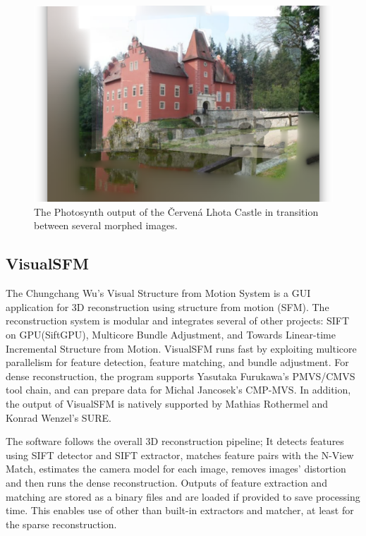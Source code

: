 \begin{figure}[ht]
	\begin{center}
		\includegraphics[keepaspectratio,width=\textwidth]{fig/Photosynth.png}
	\end{center}
	\caption{The Photosynth output of the Červená Lhota Castle in transition between several morphed images.}
	\label{fig:photosynth}
\end{figure}

\subsection*{VisualSFM}
The Chungchang Wu's Visual Structure from Motion System is a GUI application for 3D reconstruction using structure from motion (SFM). The reconstruction system is modular and integrates several of other projects: SIFT on GPU(SiftGPU), Multicore Bundle Adjustment, and Towards Linear-time Incremental Structure from Motion. VisualSFM runs fast by exploiting multicore parallelism for feature detection, feature matching, and bundle adjustment. For dense reconstruction, the program supports Yasutaka Furukawa's PMVS/CMVS tool chain, and can prepare data for Michal Jancosek's CMP-MVS. In addition, the output of VisualSFM is natively supported by Mathias Rothermel and Konrad Wenzel's SURE.

The software follows the overall 3D reconstruction pipeline; It detects features using SIFT detector and SIFT extractor, matches feature pairs with the N-View Match, estimates the camera model for each image, removes images' distortion and then runs the dense reconstruction. Outputs of feature extraction and matching are stored as a binary files and are loaded if provided to save processing time. This enables use of other than built-in extractors and matcher, at least for the sparse reconstruction. \cite{www:visual_sfm}

